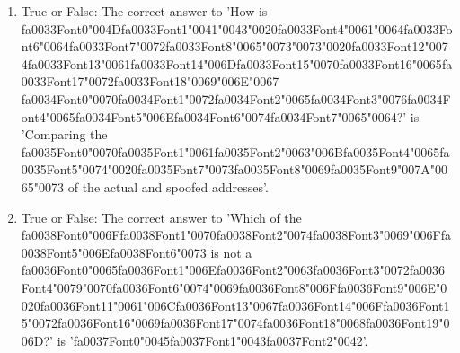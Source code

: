 \documentclass[12pt]{article}
\begin{document}
\begin{enumerate}[label=\arabic*.]
\item True or False: The correct answer to 'How is {\csname fa0033Font0\endcsname\char"004D}{\csname fa0033Font1\endcsname\char"0041}{\char"0043}{\char"0020}{\csname fa0033Font4\endcsname\char"0061}{\char"0064}{\csname fa0033Font6\endcsname\char"0064}{\csname fa0033Font7\endcsname\char"0072}{\csname fa0033Font8\endcsname\char"0065}{\char"0073}{\char"0073}{\char"0020}{\csname fa0033Font12\endcsname\char"0074}{\csname fa0033Font13\endcsname\char"0061}{\csname fa0033Font14\endcsname\char"006D}{\csname fa0033Font15\endcsname\char"0070}{\csname fa0033Font16\endcsname\char"0065}{\csname fa0033Font17\endcsname\char"0072}{\csname fa0033Font18\endcsname\char"0069}{\char"006E}{\char"0067} {\csname fa0034Font0\endcsname\char"0070}{\csname fa0034Font1\endcsname\char"0072}{\csname fa0034Font2\endcsname\char"0065}{\csname fa0034Font3\endcsname\char"0076}{\csname fa0034Font4\endcsname\char"0065}{\csname fa0034Font5\endcsname\char"006E}{\csname fa0034Font6\endcsname\char"0074}{\csname fa0034Font7\endcsname\char"0065}{\char"0064}?' is 'Comparing the {\csname fa0035Font0\endcsname\char"0070}{\csname fa0035Font1\endcsname\char"0061}{\csname fa0035Font2\endcsname\char"0063}{\char"006B}{\csname fa0035Font4\endcsname\char"0065}{\csname fa0035Font5\endcsname\char"0074}{\char"0020}{\csname fa0035Font7\endcsname\char"0073}{\csname fa0035Font8\endcsname\char"0069}{\csname fa0035Font9\endcsname\char"007A}{\char"0065}{\char"0073} of the actual and spoofed addresses'.
\item True or False: The correct answer to 'Which of the {\csname fa0038Font0\endcsname\char"006F}{\csname fa0038Font1\endcsname\char"0070}{\csname fa0038Font2\endcsname\char"0074}{\csname fa0038Font3\endcsname\char"0069}{\char"006F}{\csname fa0038Font5\endcsname\char"006E}{\csname fa0038Font6\endcsname\char"0073} is not a {\csname fa0036Font0\endcsname\char"0065}{\csname fa0036Font1\endcsname\char"006E}{\csname fa0036Font2\endcsname\char"0063}{\csname fa0036Font3\endcsname\char"0072}{\csname fa0036Font4\endcsname\char"0079}{\char"0070}{\csname fa0036Font6\endcsname\char"0074}{\char"0069}{\csname fa0036Font8\endcsname\char"006F}{\csname fa0036Font9\endcsname\char"006E}{\char"0020}{\csname fa0036Font11\endcsname\char"0061}{\char"006C}{\csname fa0036Font13\endcsname\char"0067}{\csname fa0036Font14\endcsname\char"006F}{\csname fa0036Font15\endcsname\char"0072}{\csname fa0036Font16\endcsname\char"0069}{\csname fa0036Font17\endcsname\char"0074}{\csname fa0036Font18\endcsname\char"0068}{\csname fa0036Font19\endcsname\char"006D}?' is '{\csname fa0037Font0\endcsname\char"0045}{\csname fa0037Font1\endcsname\char"0043}{\csname fa0037Font2\endcsname\char"0042}'.

\end{enumerate}
\end{document}
